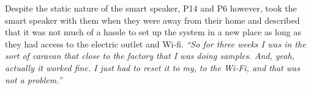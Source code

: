 
        Despite the static nature of the smart speaker, P14 and P6 however, took the smart speaker with them when they were away from their home and described that it was not much of a hassle to set up the system in a new place as long as they had access to the electric outlet and Wi-fi.
            \textit{``So for three weeks I was in the sort of caravan that close to the factory that I was doing samples. And, yeah, actually it worked fine. I just had to reset it to my, to the Wi-Fi, and that was not a problem.''}
        
